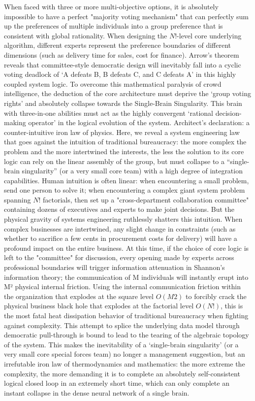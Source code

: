 \documentclass[11pt,a4paper]{article}
\begin{document}
When faced with three or more multi-objective options, it is absolutely impossible to have a perfect "majority voting mechanism" that can perfectly sum up the preferences of multiple individuals into a group preference that is consistent with global rationality. When designing the $N!$-level core underlying algorithm, different experts represent the preference boundaries of different dimensions (such as delivery time for sales, cost for finance). Arrow’s theorem reveals that committee-style democratic design will inevitably fall into a cyclic voting deadlock of ‘A defeats B, B defeats C, and C defeats A’ in this highly coupled system logic. To overcome this mathematical paralysis of crowd intelligence, the deduction of the core architecture must deprive the ‘group voting rights’ and absolutely collapse towards the Single-Brain Singularity. This brain with three-in-one abilities must act as the highly convergent ‘rational decision-making operator’ in the logical evolution of the system. Architect’s declaration: a counter-intuitive iron law of physics. Here, we reveal a system engineering law that goes against the intuition of traditional bureaucracy: the more complex the problem and the more intertwined the interests, the less the solution to its core logic can rely on the linear assembly of the group, but must collapse to a “single-brain singularity” (or a very small core team) with a high degree of integration capabilities. Human intuition is often linear: when encountering a small problem, send one person to solve it; when encountering a complex giant system problem spanning $N!$ factorials, then set up a "cross-department collaboration committee" containing dozens of executives and experts to make joint decisions. But the physical gravity of systems engineering ruthlessly shatters this intuition. When complex businesses are intertwined, any slight change in constraints (such as whether to sacrifice a few cents in procurement costs for delivery) will have a profound impact on the entire business. At this time, if the choice of core logic is left to the "committee" for discussion, every opening made by experts across professional boundaries will trigger information attenuation in Shannon's information theory; the communication of M individuals will instantly erupt into M² physical internal friction. Using the internal communication friction within the organization that explodes at the square level $O(M2)$ to forcibly crack the physical business black hole that explodes at the factorial level $O(N!)$, this is the most fatal heat dissipation behavior of traditional bureaucracy when fighting against complexity. This attempt to splice the underlying data model through democratic pull-through is bound to lead to the tearing of the algebraic topology of the system. This makes the inevitability of a ‘single-brain singularity’ (or a very small core special forces team) no longer a management suggestion, but an irrefutable iron law of thermodynamics and mathematics: the more extreme the complexity, the more demanding it is to complete an absolutely self-consistent logical closed loop in an extremely short time, which can only complete an instant collapse in the dense neural network of a single brain.
\end{document}
